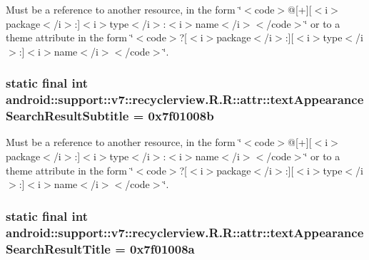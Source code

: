 Must be a reference to another resource, in the form \char`\"{}$<$code$>$@\mbox{[}+\mbox{]}\mbox{[}$<$i$>$package$<$/i$>$:\mbox{]}$<$i$>$type$<$/i$>$:$<$i$>$name$<$/i$>$$<$/code$>$\char`\"{} or to a theme attribute in the form \char`\"{}$<$code$>$?\mbox{[}$<$i$>$package$<$/i$>$:\mbox{]}\mbox{[}$<$i$>$type$<$/i$>$:\mbox{]}$<$i$>$name$<$/i$>$$<$/code$>$\char`\"{}. \hypertarget{classandroid_1_1support_1_1v7_1_1recyclerview_1_1_r_1_1attr_d0702e98bb2ac7249889e947e5c76822}{
\subsubsection[{textAppearanceSearchResultSubtitle}]{\setlength{\rightskip}{0pt plus 5cm}static final int android::support::v7::recyclerview.R.R::attr::textAppearanceSearchResultSubtitle = 0x7f01008b}}
\label{classandroid_1_1support_1_1v7_1_1recyclerview_1_1_r_1_1attr_d0702e98bb2ac7249889e947e5c76822}


Must be a reference to another resource, in the form \char`\"{}$<$code$>$@\mbox{[}+\mbox{]}\mbox{[}$<$i$>$package$<$/i$>$:\mbox{]}$<$i$>$type$<$/i$>$:$<$i$>$name$<$/i$>$$<$/code$>$\char`\"{} or to a theme attribute in the form \char`\"{}$<$code$>$?\mbox{[}$<$i$>$package$<$/i$>$:\mbox{]}\mbox{[}$<$i$>$type$<$/i$>$:\mbox{]}$<$i$>$name$<$/i$>$$<$/code$>$\char`\"{}. \hypertarget{classandroid_1_1support_1_1v7_1_1recyclerview_1_1_r_1_1attr_6752b9fa63ef92f2f8ef94a5ab64e267}{
\subsubsection[{textAppearanceSearchResultTitle}]{\setlength{\rightskip}{0pt plus 5cm}static final int android::support::v7::recyclerview.R.R::attr::textAppearanceSearchResultTitle = 0x7f01008a}}
\label{classandroid_1_1support_1_1v7_1_1recyclerview_1_1_r_1_1attr_6752b9fa63ef92f2f8ef94a5ab64e267}


